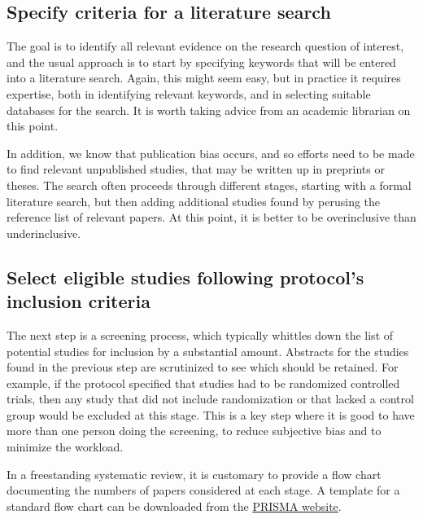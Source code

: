 \documentclass{krantz}
\begin{document}
\hypertarget{specify-criteria-for-a-literature-search}{%
\subsection{Specify criteria for a literature search}\label{specify-criteria-for-a-literature-search}}

The goal is to identify all relevant evidence on the research question of interest, and the usual approach is to start by specifying keywords that will be entered into a literature search. Again, this might seem easy, but in practice it requires expertise, both in identifying relevant keywords, and in selecting suitable databases for the search. It is worth taking advice from an academic librarian on this point.

In addition, we know that publication bias occurs, and so efforts need to be made to find relevant unpublished studies, that may be written up in preprints or theses. The search often proceeds through different stages, starting with a formal literature search, but then adding additional studies found by perusing the reference list of relevant papers. At this point, it is better to be overinclusive than underinclusive.

\hypertarget{select-eligible-studies-following-protocols-inclusion-criteria}{%
\subsection{Select eligible studies following protocol's inclusion criteria}\label{select-eligible-studies-following-protocols-inclusion-criteria}}

The next step is a screening process, which typically whittles down the list of potential studies for inclusion by a substantial amount. Abstracts for the studies found in the previous step are scrutinized to see which should be retained. For example, if the protocol specified that studies had to be randomized controlled trials, then any study that did not include randomization or that lacked a control group would be excluded at this stage. This is a key step where it is good to have more than one person doing the screening, to reduce subjective bias and to minimize the workload.

In a freestanding systematic review, it is customary to provide a flow chart documenting the numbers of papers considered at each stage. A template for a standard flow chart can be downloaded from the \href{http://prisma-statement.org/prismastatement/flowdiagram.aspx}{PRISMA website}.
\end{document}
